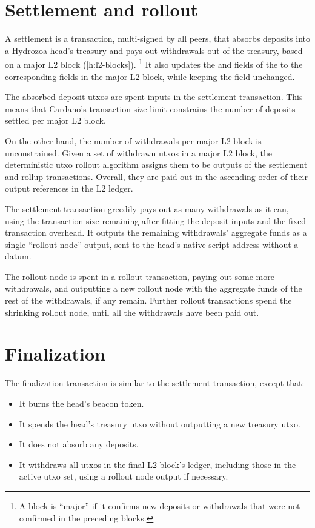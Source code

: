 \documentclass[../hydrozoa.tex]{subfiles}
\begin{document}
\section{Settlement and rollout}%
\label{h:l1-multisig-settlement-rollout}%

A settlement is a transaction, multi-signed by all peers, that absorbs deposits into a Hydrozoa head's treasury and pays out withdrawals out of the treasury, based on a major L2 block (\cref{h:l2-blocks}).%
\footnote{A block is ``major'' if it confirms new deposits or withdrawals that were not confirmed in the preceding blocks.}
It also updates the  and  fields of the  to the corresponding fields in the major L2 block, while keeping the  field unchanged.

The absorbed deposit utxos are spent inputs in the settlement transaction.
This means that Cardano's transaction size limit constrains the number of deposits settled per major L2 block.

On the other hand, the number of withdrawals per major L2 block is unconstrained.
Given a set of withdrawn utxos in a major L2 block, the deterministic utxo rollout algorithm assigns them to be outputs of the settlement and rollup transactions.
Overall, they are paid out in the ascending order of their output references in the L2 ledger.


The settlement transaction greedily pays out as many withdrawals as it can, using the transaction size remaining after fitting the deposit inputs and the fixed transaction overhead.
It outputs the remaining withdrawals' aggregate funds as a single ``rollout node'' output, sent to the head's native script address without a datum.

The rollout node is spent in a rollout transaction, paying out some more withdrawals, and outputting a new rollout node with the aggregate funds of the rest of the withdrawals, if any remain.
Further rollout transactions spend the shrinking rollout node, until all the withdrawals have been paid out.

\section{Finalization}%
\label{h:l1-multisig-finalization}%

The finalization transaction is similar to the settlement transaction, except that:
\begin{itemize}
  \item It burns the head's beacon token.
  \item It spends the head's treasury utxo without outputting a new treasury utxo.
  \item It does not absorb any deposits.
  \item It withdraws all utxos in the final L2 block's ledger, including those in the active utxo set, using a rollout node output if necessary.
\end{itemize}
\end{document}
